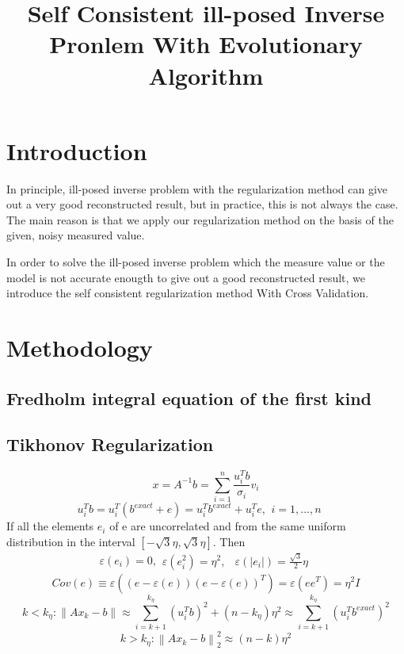 \documentclass{article}
\begin{document}
\title{Self Consistent ill-posed Inverse Pronlem With Evolutionary Algorithm}
\maketitle

\section{Introduction}
In principle, ill-posed inverse problem with the regularization method can give
out a very good reconstructed result, but in practice, this is not always the
case. The main reason is that we apply our regularization method on the basis of
the given, noisy measured value.

In order to solve the ill-posed inverse problem
which the measure value or the model is not accurate enougth to give out a good reconstructed result, we
introduce the self consistent regularization method With Cross Validation.
\section{Methodology}
\subsection{Fredholm integral equation of the first kind}
\subsection{Tikhonov Regularization}
\begin{equation}
x = {A^{ - 1}}b = \sum\limits_{i = 1}^n {\frac{{u_i^Tb}}{{{\sigma _i}}}{v_i}}
\end{equation}
\begin{equation}
u_i^Tb = u_i^T({b^{exact}} + e) = u_i^T{b^{exact}} + u_i^Te,\begin{array}{*{20}{c}}
{i = 1,...,n}&{}
\end{array}
\end{equation}
If all the elements \({e_i}\) of e are uncorrelated and from the same uniform
distribution in the interval \([ - \sqrt 3 \eta ,\sqrt 3 \eta ]\). Then
\[\varepsilon ({e_i}) = 0,\begin{array}{*{20}{c}}
{\varepsilon (e_i^2) = {\eta ^2},}&{\varepsilon (\left| {{e_i}} \right|) = \frac{{\sqrt 3 }}{2}\eta }
\end{array}\]
\begin{equation}
Cov(e) \equiv \varepsilon ((e - \varepsilon (e)){(e - \varepsilon (e))^T}) =
\varepsilon (e{e^T}) = {\eta ^2}I
\end{equation}
\begin{equation}
k < {k_\eta }:\left\| {A{x_k} - b} \right\| \approx \sum\limits_{i = k +
1}^{{k_\eta }} {{{(u_i^Tb)}^2} + (n - {k_\eta }){\eta ^2} \approx \sum\limits_{i = k + 1}^{{k_\eta }} {{{(u_i^T{b^{exact}})}^2}} } 
\end{equation}
\begin{equation}
k > {k_\eta }:\left\| {A{x_k} - b} \right\|_2^2 \approx (n - k){\eta ^2}
\end{equation}
\end{document}
